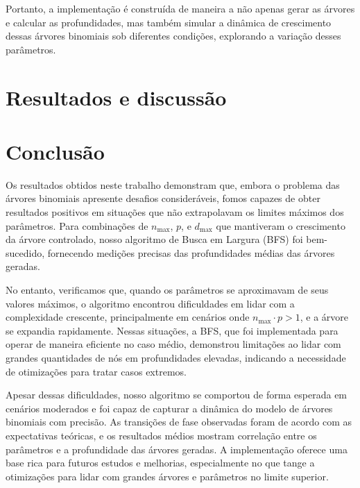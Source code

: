\documentclass[12pt, a4paper]{scrreprt}
\begin{document}
Portanto, a implementação é construída de maneira a não apenas gerar as árvores e calcular as profundidades, mas também simular a dinâmica de crescimento dessas árvores binomiais sob diferentes condições, explorando a variação desses parâmetros.

\chapter{Resultados e discussão}

\chapter{Conclusão}
Os resultados obtidos neste trabalho demonstram que, embora o problema das árvores binomiais apresente desafios consideráveis, fomos capazes de obter resultados positivos em situações que não extrapolavam os limites máximos dos parâmetros. Para combinações de \( n_{\text{max}} \), \( p \), e \( d_{\text{max}} \) que mantiveram o crescimento da árvore controlado, nosso algoritmo de Busca em Largura (BFS) foi bem-sucedido, fornecendo medições precisas das profundidades médias das árvores geradas.

No entanto, verificamos que, quando os parâmetros se aproximavam de seus valores máxi\-mos, o algoritmo encontrou dificuldades em lidar com a complexidade crescente, principalmente em cenários onde \( n_{\text{max}} \cdot p > 1 \), e a árvore se expandia rapidamente. Nessas situações, a BFS, que foi implementada para operar de maneira eficiente no caso médio, demonstrou limitações ao lidar com grandes quantidades de nós em profundidades elevadas, indicando a necessidade de otimizações para tratar casos extremos.

Apesar dessas dificuldades, nosso algoritmo se comportou de forma esperada em cenários moderados e foi capaz de capturar a dinâmica do modelo de árvores binomiais com precisão. As transições de fase observadas foram de acordo com as expectativas teóricas, e os resultados médios mostram correlação entre os parâmetros e a profundidade das árvores geradas. A implementação oferece uma base rica para futuros estudos e melhorias, especialmente no que tange a otimizações para lidar com grandes árvores e parâmetros no limite superior.

\printbibliography %


\end{document}
